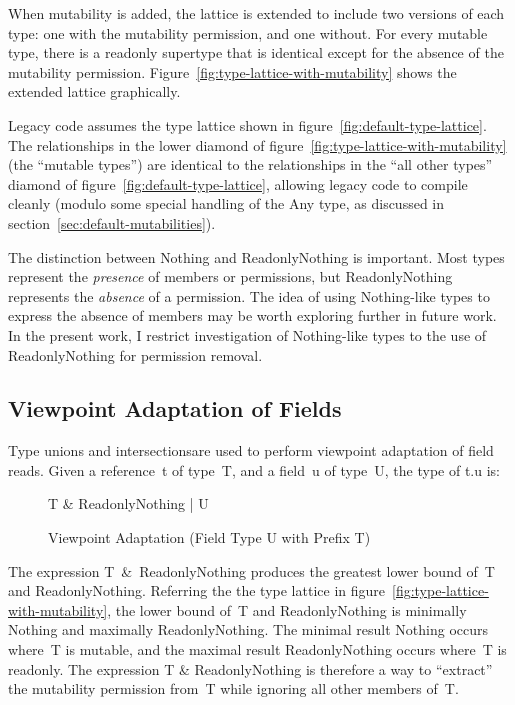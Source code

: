 When mutability is added, the lattice is extended to include two versions of each type: one with the mutability permission, and one without. For every mutable type, there is a readonly supertype that is identical except for the absence of the mutability permission. Figure~\ref{fig:type-lattice-with-mutability} shows the extended lattice graphically.

Legacy code assumes the type lattice shown in figure~\ref{fig:default-type-lattice}. The relationships in the lower diamond of figure~\ref{fig:type-lattice-with-mutability} (the ``mutable types'') are identical to the relationships in the ``all other types'' diamond of figure~\ref{fig:default-type-lattice}, allowing legacy code to compile cleanly (modulo some special handling of the {\cd Any} type, as discussed in section~\ref{sec:default-mutabilities}).

The distinction between {\cd Nothing} and {\cd ReadonlyNothing} is important. Most types represent the {\em presence} of members or permissions, but {\cd ReadonlyNothing} represents the {\em absence} of a permission. The idea of using {\cd Nothing}-like types to express the absence of members may be worth exploring further in future work. In the present work, I restrict investigation of {\cd Nothing}-like types to the use of {\cd ReadonlyNothing} for permission removal.



\subsection{Viewpoint Adaptation of Fields}

Type unions and intersectionsare used to perform viewpoint adaptation of field reads.
Given a reference~{\cd t} of type~{\cd T}, and a field~{\cd u} of type~{\cd U}, the type of \mbox{\cd t.u} is:
\begin{figure}[h]
\center
{\cd T \& ReadonlyNothing | U}
\caption{Viewpoint Adaptation (Field Type {\cd U} with Prefix {\cd T})}
\label{fig:viewpoint-adapted-type}
\end{figure}

The expression \mbox{\cd T \& ReadonlyNothing} produces the greatest lower bound of~{\cd T} and {\cd ReadonlyNothing}. Referring the the type lattice in figure~\ref{fig:type-lattice-with-mutability}, the lower bound of~{\cd T} and {\cd ReadonlyNothing} is minimally {\cd Nothing} and maximally {\cd ReadonlyNothing}. The minimal result {\cd Nothing} occurs where~{\cd T} is mutable, and the maximal result {\cd ReadonlyNothing} occurs where~{\cd T} is readonly. The expression {\cd T \& ReadonlyNothing} is therefore a way to ``extract'' the mutability permission from~{\cd T} while ignoring all other members of~{\cd T}.

